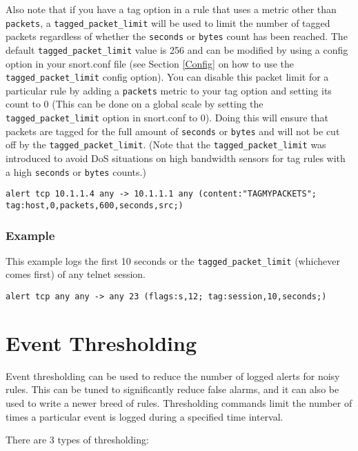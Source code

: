 \documentclass[english]{report}
\begin{document}
Also note that if you have a tag option in a rule that uses a metric other than \texttt{packets},
a \texttt{tagged\_packet\_limit} will be used to limit the number of tagged packets regardless
of whether the \texttt{seconds} or \texttt{bytes} count has been reached.
The default \texttt{tagged\_packet\_limit} value is 256 and can be modified by using a config option
in your snort.conf file (see Section \ref{Config} on how to use the \texttt{tagged\_packet\_limit} config option).
You can disable this packet limit for a particular rule by adding a \texttt{packets} metric to 
your tag option and setting its count to 0 (This can be done on a global scale by setting the
\texttt{tagged\_packet\_limit} option in snort.conf to 0).  Doing this will ensure that packets are tagged for the
full amount of \texttt{seconds} or \texttt{bytes} and will not be cut off by the \texttt{tagged\_packet\_limit}. 
(Note that the \texttt{tagged\_packet\_limit} was introduced to avoid DoS situations on high bandwidth sensors for
tag rules with a high \texttt{seconds} or \texttt{bytes} counts.)

\begin{verbatim}
alert tcp 10.1.1.4 any -> 10.1.1.1 any (content:"TAGMYPACKETS"; tag:host,0,packets,600,seconds,src;)
\end{verbatim}


\subsubsection{Example}

This example logs the first 10 seconds or the \texttt{tagged\_packet\_limit} (whichever comes first) of any telnet session.
\begin{verbatim}
alert tcp any any -> any 23 (flags:s,12; tag:session,10,seconds;)
\end{verbatim}


\section{Event Thresholding\label{Event Thresholding}}

Event thresholding can be used to reduce the number of logged alerts for noisy
rules.  This can be tuned to significantly reduce false alarms, and it can also
be used to write a newer breed of rules. Thresholding commands limit the number
of times a particular event is logged during a specified time interval. 

There are 3 types of thresholding:
\end{document}

